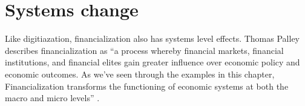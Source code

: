 


\section{Systems change}



Like digitiazation, financialization also has systems level effects. Thomas Palley describes financialization as ``a process whereby financial markets, financial institutions, and financial elites gain greater influence over economic policy and economic outcomes. As we've seen through the examples in this chapter, Financialization transforms the functioning of economic systems at both the macro and micro levels'' \cite{palleyFinancializationWhatIt2007}. 

